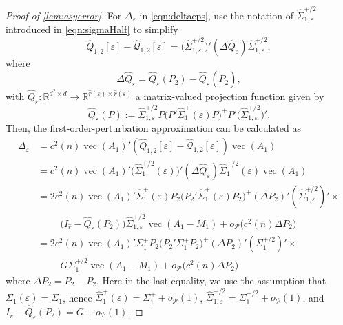 \documentclass[12pt]{article}
\numberwithin{equation}{section}
\numberwithin{table}{section}
\numberwithin{thm}{section}
\numberwithin{defn}{section}
\numberwithin{lem}{section}
\numberwithin{prop}{section}
\numberwithin{cor}{section}
\numberwithin{rem}{section}
\DeclareMathOperator{\Vector}{vec}
\begin{document}
\begin{appendix}
\begin{proof}[Proof of \autoref{lem:asyerror}]
For $\Delta_\varepsilon$ in \eqref{eqn:deltaeps}, use the notation of $\widehat{\Sigma}_{1,\varepsilon}^{+/2}$ introduced in \eqref{eqn:sigmaHalf} to simplify 
\begin{equation} %
\widehat{Q}_{1,2}[\varepsilon] - \widehat{\mathcal{Q}}_{1,2}[\varepsilon]
= \big(\widehat{\Sigma}_{1,\varepsilon}^{+/2}\big)' (\Delta \widehat{Q}_\varepsilon) \widehat{\Sigma}_{1,\varepsilon}^{+/2},
\end{equation}
where
$$
\Delta \widehat{Q}_\varepsilon = \widehat{Q}_\varepsilon(P_2) - \widehat{Q}_\varepsilon(\widehat{P}_2),
$$
with
$\widehat{Q}_\varepsilon: \mathbb{R}^{d^2 \times d} \to \mathbb{R}^{\widehat{r}(\varepsilon) \times \widehat{r}(\varepsilon)}$ a matrix-valued projection function given by
$$
\widehat{Q}_\varepsilon(P) := \widehat{\Sigma}_{1,\varepsilon}^{+/2} P \big(P' \widehat{\Sigma}_1^+(\varepsilon) P\big)^+ P' \big(\widehat{\Sigma}_{1,\varepsilon}^{+/2}\big)'.
$$
Then, the first-order-perturbation approximation can be calculated as
\begin{equation}\label{eqn:delta1}
\begin{aligned}
    \Delta_\varepsilon &= 
    c^2(n) \Vector (A_1)' (\widehat{Q}_{1,2}[\varepsilon] - \widehat{\mathcal{Q}}_{1,2}[\varepsilon]) \Vector(A_1) \\
    &=
    c^2(n) \Vector(A_1)' \big(\widehat{\Sigma}_1^{+/2}(\varepsilon)\big)' (\Delta \widehat{Q}_\varepsilon) \widehat{\Sigma}_1^{+/2}(\varepsilon) \Vector(A_1)\\
    &=
    2 c^2(n) \Vector(A_1)' \widehat{\Sigma}_1^{+}(\varepsilon) P_2 \big(P_2' \widehat{\Sigma}_1^+(\varepsilon) P_2\big)^+ (\Delta P_2)' (\widehat{\Sigma}_{1,\varepsilon}^{+/2} )' \times \\
    & \hspace{1cm} \big(I_{\widehat{r}} - \widehat{Q}_\varepsilon(P_2)\big) \widehat{\Sigma}_{1,\varepsilon}^{+/2} \Vector(A_1 - M_1)
    + o_{\mathcal{P}}\big(c^2(n) \Delta P_2\big)\\
    &= 2 c^2(n) \Vector(A_1)' \Sigma_1^{+} P_2 \big(P_2' \Sigma_1^+ P_2\big)^+ (\Delta P_2)' (\Sigma_{1}^{+/2} )' \times \\
    & \hspace{1cm} G \Sigma_1^{+/2} \Vector(A_1 - M_1)
    + o_{\mathcal{P}}\big(c^2(n) \Delta P_2\big)
\end{aligned}
\end{equation}
where $\Delta P_2 = \widehat{P}_2 - P_2$. Here in the last equality, we use the assumption that $\Sigma_1(\varepsilon) = \Sigma_1$, hence $\widehat{\Sigma}_1^+(\varepsilon) = \Sigma_1^+ + o_{\mathcal{P}}(1)$, $\widehat{\Sigma}_{1,\varepsilon}^{+/2} = \Sigma_1^{+/2} + o_{\mathcal{P}}(1)$, and $I_{\widehat{r}} - \widehat{Q}_\varepsilon(P_2) = G + o_{\mathcal{P}}(1)$.


\end{proof}
\end{appendix}
\end{document}
